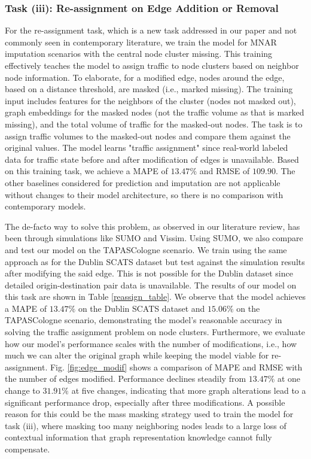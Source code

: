 \subsubsection{Task (iii): Re-assignment on Edge Addition or Removal}
For the re-assignment task, which is a new task addressed in our paper and not commonly seen in contemporary literature, we train the model for MNAR imputation scenarios with the central node cluster missing. This training effectively teaches the model to assign traffic to node clusters based on neighbor node information. To elaborate, for a modified edge, nodes around the edge, based on a distance threshold, are masked (i.e., marked missing). The training input includes features for the neighbors of the cluster (nodes not masked out), graph embeddings for the masked nodes (not the traffic volume as that is marked missing), and the total volume of traffic for the masked-out nodes. The task is to assign traffic volumes to the masked-out nodes and compare them against the original values. The model learns "traffic assignment" since real-world labeled data for traffic state before and after modification of edges is unavailable. Based on this training task, we achieve a MAPE of $13.47\%$ and RMSE of $109.90$. The other baselines considered for prediction and imputation are not applicable without changes to their model architecture, so there is no comparison with contemporary models.

The de-facto way to solve this problem, as observed in our literature review, has been through simulations like SUMO\cite{sumo} and Vissim\cite{vissim}. Using SUMO, we also compare and test our model on the TAPASCologne scenario. We train using the same approach as for the Dublin SCATS dataset but test against the simulation results after modifying the said edge. This is not possible for the Dublin dataset since detailed origin-destination pair data is unavailable. The results of our model on this task are shown in Table \ref{reassign_table}. We observe that the model achieves a MAPE of $13.47\%$ on the Dublin SCATS dataset and $15.06\%$ on the TAPASCologne scenario, demonstrating the model's reasonable accuracy in solving the traffic assignment problem on node clusters. Furthermore, we evaluate how our model's performance scales with the number of modifications, i.e., how much we can alter the original graph while keeping the model viable for re-assignment. Fig. \ref{fig:edge_modif} shows a comparison of MAPE and RMSE with the number of edges modified. Performance declines steadily from $13.47\%$ at one change to $31.91\%$ at five changes, indicating that more graph alterations lead to a significant performance drop, especially after three modifications. A possible reason for this could be the mass masking strategy used to train the model for task (iii), where masking too many neighboring nodes leads to a large loss of contextual information that graph representation knowledge cannot fully compensate.


